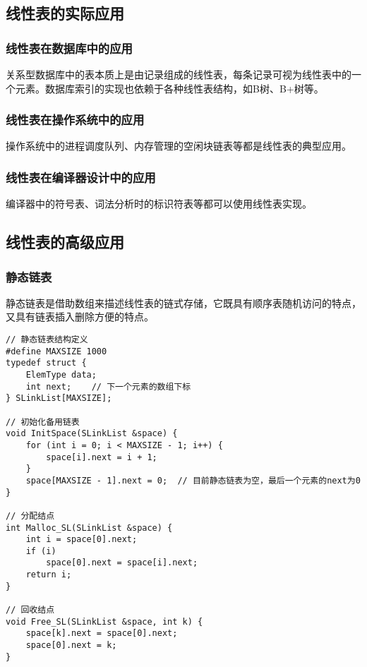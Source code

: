 \documentclass{../../note}
\begin{document}
\subsection{线性表的实际应用}

\subsubsection{线性表在数据库中的应用}
关系型数据库中的表本质上是由记录组成的线性表，每条记录可视为线性表中的一个元素。数据库索引的实现也依赖于各种线性表结构，如B树、B+树等。

\subsubsection{线性表在操作系统中的应用}
操作系统中的进程调度队列、内存管理的空闲块链表等都是线性表的典型应用。

\subsubsection{线性表在编译器设计中的应用}
编译器中的符号表、词法分析时的标识符表等都可以使用线性表实现。

\subsection{线性表的高级应用}

\subsubsection{静态链表}
静态链表是借助数组来描述线性表的链式存储，它既具有顺序表随机访问的特点，又具有链表插入删除方便的特点。

\begin{verbatim}
// 静态链表结构定义
#define MAXSIZE 1000
typedef struct {
    ElemType data;
    int next;    // 下一个元素的数组下标
} SLinkList[MAXSIZE];

// 初始化备用链表
void InitSpace(SLinkList &space) {
    for (int i = 0; i < MAXSIZE - 1; i++) {
        space[i].next = i + 1;
    }
    space[MAXSIZE - 1].next = 0;  // 目前静态链表为空，最后一个元素的next为0
}

// 分配结点
int Malloc_SL(SLinkList &space) {
    int i = space[0].next;
    if (i)
        space[0].next = space[i].next;
    return i;
}

// 回收结点
void Free_SL(SLinkList &space, int k) {
    space[k].next = space[0].next;
    space[0].next = k;
}
\end{verbatim}
\end{document}
